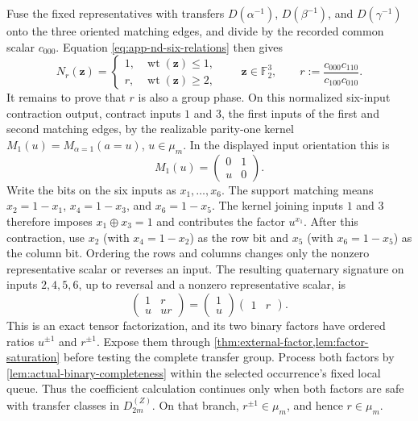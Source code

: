 \documentclass[11pt,letterpaper,onecolumn]{article}
\theoremstyle{plain}
\theoremstyle{definition}
\theoremstyle{remark}
\newcommand{\Ftwo}{\mathbb F_2}
\newcommand{\DihZ}[1]{{D_{#1}^{(Z)}}}
\newcommand{\wt}{\operatorname{wt}}
\begin{document}
Fuse the fixed representatives with transfers
\(D(\alpha^{-1})\),
\(D(\beta^{-1})\), and
\(D(\gamma^{-1})\) onto the three oriented matching edges, and
divide by the recorded common scalar \(c_{000}\).  Equation
\cref{eq:app-nd-six-relations} then gives
\[
 N_r({\mathbf z})=
 \begin{cases}
  1,&\wt({\mathbf z})\le1,\\
  r,&\wt({\mathbf z})\ge2,
 \end{cases}
 \qquad {\mathbf z}\in\Ftwo^3,\qquad
 r:=\frac{c_{000}c_{110}}{c_{100}c_{010}}.
\]
It remains to prove that \(r\) is also a group phase.  On this normalized six-input contraction output, contract inputs \(1\) and \(3\), the first inputs
of the first and second matching edges, by the realizable parity-one kernel
\(M_1(u)=M_{\alpha=1}(a=u)\), \(u\in\mu_m\). In the displayed input
orientation this is
\[
 M_1(u)=\begin{pmatrix}0&1\\ u&0\end{pmatrix}.
\]
Write the bits on the six inputs as
\(x_1,\ldots,x_6\). The support matching means
\(x_2=1-x_1\), \(x_4=1-x_3\), and \(x_6=1-x_5\).
The kernel joining inputs \(1\) and \(3\) therefore imposes
\(x_1\oplus x_3=1\) and contributes the factor \(u^{x_1}\).
After this contraction, use \(x_2\) (with \(x_4=1-x_2\)) as the row bit
and \(x_5\) (with \(x_6=1-x_5\)) as the column bit.  Ordering the rows and
columns changes only the nonzero representative scalar or reverses
an input.
The resulting quaternary signature on inputs
\(2,4,5,6\), up to reversal and a nonzero representative scalar, is
\[
 \begin{pmatrix}1&r\\ u&ur\end{pmatrix}
 =\begin{pmatrix}1\\u\end{pmatrix}
  \begin{pmatrix}1&r\end{pmatrix}.
\]
This is an exact tensor factorization, and its two binary factors have
ordered ratios \(u^{\pm1}\) and \(r^{\pm1}\).  Expose them through
\cref{thm:external-factor,lem:factor-saturation} before testing the complete transfer group.  Process both factors by \cref{lem:actual-binary-completeness} within
the selected occurrence's fixed local queue.  Thus the coefficient
calculation continues only when both factors are safe with transfer classes in
\(\DihZ{2m}\).  On that branch,
\(r^{\pm1}\in\mu_m\), and hence \(r\in\mu_m\).  \hypertarget{eq:app-nd-Nr}{}
\end{document}
